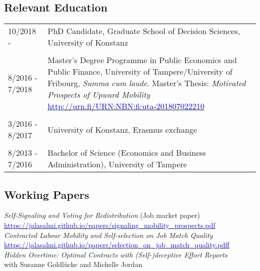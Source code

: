 \documentclass[16pt]{article}
\begin{document}
\subsection*{Relevant Education}
\begin{tabular}{@{}p{1.5in}p{5in}}
10/2018 -          & PhD Candidate, Graduate School of Decision Sciences, University of Konstanz \\
                        
\\
8/2016 - 7/2018 & Master's Degree Programme in Public Economics and Public Finance, University of Tampere/University of Fribourg, \textit{Summa cum laude}. Master's Thesis: \textit{Motivated Prospects of Upward Mobility} \href{http://urn.fi/URN:NBN:fi:uta-201807022210}{\textcolor{blue}{http://urn.fi/URN:NBN:fi:uta-201807022210}}\\
\\
3/2016 - 8/2017 & University of Konstanz, Erasmus exchange \\
\\
8/2013 - 7/2016 & Bachelor of Science (Economics and Business Administration), University of Tampere\\
\end{tabular}

\subsection*{Working Papers}

\noindent \textit{Self-Signaling and Voting for Redistribution} (Job market paper) \\ \href{https://jalasalmi.github.io/papers/signaling\_mobility\_prospects.pdf}{\textcolor{blue}{https://jalasalmi.github.io/papers/signaling\_mobility\_prospects.pdf}} \\

\noindent \textit{Contracted Labour Mobility and Self-selection on Job Match Quality} \\ \href{https://jalasalmi.github.io/papers/selection\_on\_job\_match\_quality.pdf}{\textcolor{blue}{https://jalasalmi.github.io/papers/selection\_on\_job\_match\_quality.pdff}} \\

\noindent \textit{Hidden Overtime: Optimal Contracts with (Self-)deceptive Effort Reports} \\
with Susanne Goldlücke and Michelle Jordan \\
\end{document}
